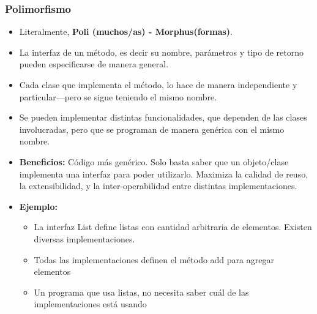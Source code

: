 \documentclass{beamer}
\begin{document}
  \begin{frame}
    \frametitle{Polimorfismo}
    \begin{itemize}
      
    \item Literalmente, \textbf{Poli (muchos/as) - Morphus(formas)}.
      
    \item La interfaz de un método, es decir su nombre, parámetros y tipo de
      retorno pueden especificarse de manera general.
      
    \item Cada clase que implementa el método, lo hace de manera
      independiente y particular---pero se sigue teniendo el mismo
      nombre.
      
    \item Se pueden implementar distintas funcionalidades, que dependen
      de las clases involucradas, pero que se programan de manera
      genérica con el mismo nombre.
      
    \item \textbf{Beneficios:} Código más genérico. Solo basta saber que
      un objeto/clase implementa una interfaz para poder
      utilizarlo. Maximiza la calidad de reuso, la extensibilidad, y la
      inter-operabilidad entre distintas implementaciones.
      
    \item \textbf{Ejemplo:}
      \begin{itemize}
        
      \item La interfaz List define listas con cantidad arbitraria de
        elementos. Existen diversas implementaciones.
        
      \item Todas las implementaciones definen el método add para
        agregar elementos
        
      \item Un programa que usa listas, no necesita saber cuál de las
        implementaciones está usando      
        
      \end{itemize}
    \end{itemize}
  \end{frame}
\end{document}
